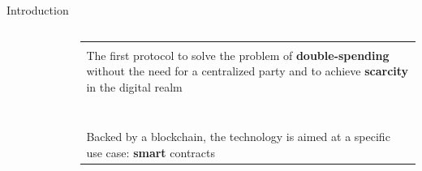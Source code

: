 \documentclass[aspectratio=169]{beamer}
\newcommand\Fontci{\fontsize{7}{7.2}\selectfont}
\begin{document}
\begin{frame}{Introduction}
	\begin{columns}[T]
		\begin{column}{.15\linewidth}			
		\begin{figure}
			\includegraphics[height=2cm, width=2cm]{Images/btc}
		\end{figure}
		\begin{figure}
			\includegraphics[height=2cm, width=2cm]{Images/eth}
		\end{figure}
		\end{column}
		\begin{column}{.35\linewidth}
		\Fontci
		\begin{tabular}{p{3.3cm}}
			\\
			\\
			The first protocol to solve the problem of \textbf{double-spending} without the need for a centralized party and to achieve \textbf{scarcity} in the digital realm 	\\
			\\
			\\
			\\
			\\
			\\
			\\
			\\
			Backed by a blockchain, the technology is aimed at a specific use case: \textbf{smart} contracts \\


\end{tabular}
\end{column}
\end{columns}
\end{frame}
\end{document}

